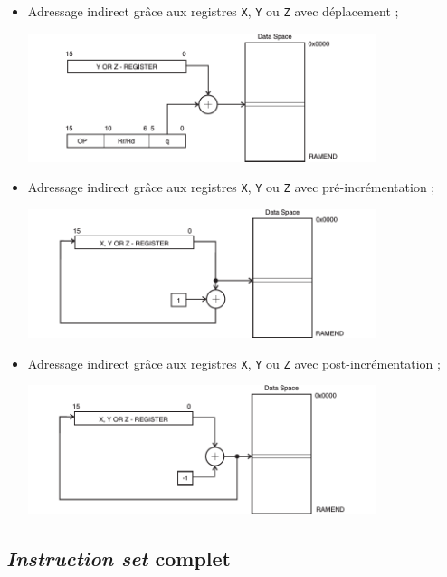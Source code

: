 \documentclass[11pt]{article}
\begin{document}
\begin{itemize}
\begin{center}
   \end{center}
\pagebreak
  \item Adressage indirect grâce aux registres \texttt{X}, \texttt{Y}
    ou \texttt{Z} avec déplacement ;
   \begin{center}
     \includegraphics[width=0.8\textwidth]{images/data_indirect_displacement.png}
   \end{center}
  \item Adressage indirect grâce aux registres \texttt{X}, \texttt{Y}
    ou \texttt{Z} avec pré-incrémentation ;
   \begin{center}
     \includegraphics[width=0.8\textwidth]{images/data_indirect_postincrement.png}
   \end{center}
  \item Adressage indirect grâce aux registres \texttt{X}, \texttt{Y}
    ou \texttt{Z} avec post-incrémentation ;
   \begin{center}
     \includegraphics[width=0.8\textwidth]{images/data_indirect_predecrement.png}
   \end{center}
\end{itemize}
\pagebreak
\subsection{\emph{Instruction set} complet}
\end{document}
